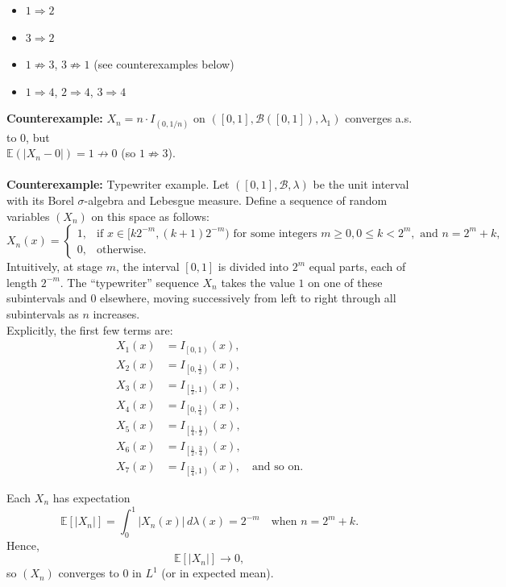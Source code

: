 \documentclass[11pt,a4paper]{article}
\theoremstyle{definition}
\begin{document}
\begin{itemize}
  \item $1 \Rightarrow 2$
  \item $3 \Rightarrow 2$
  \item $1 \not\Rightarrow 3$, $3 \not\Rightarrow 1$ (see counterexamples below)
  \item $1 \Rightarrow 4$, $2 \Rightarrow 4$, $3 \Rightarrow 4$
\end{itemize}
\noindent
\textbf{Counterexample:} $X_n = n \cdot I_{(0,1/n)}$ on $([0,1], \mathcal{B}([0,1]), \lambda_1)$ converges a.s. to $0$, but \\ $\mathbb{E}(|X_n - 0|) = 1 \not\to 0$ (so $1 \not\Rightarrow 3$).~\\~\\
\noindent
\textbf{Counterexample:} Typewriter example. Let $( [0,1], \mathcal{B}, \lambda )$ be the unit interval with its Borel $\sigma$-algebra and Lebesgue measure.  
Define a sequence of random variables $(X_n)$ on this space as follows:
\[
X_n(x) = 
\begin{cases}
1, & \text{if } x \in [k 2^{-m}, (k+1)2^{-m}) \text{ for some integers } m \ge 0, 0 \le k < 2^m, \text{ and } n = 2^m + k, \\[6pt]
0, & \text{otherwise.}
\end{cases}
\]
\noindent
Intuitively, at stage $m$, the interval $[0,1]$ is divided into $2^m$ equal parts, each of length $2^{-m}$.  
The ``typewriter'' sequence $X_n$ takes the value $1$ on one of these subintervals and $0$ elsewhere, moving successively from left to right through all subintervals as $n$ increases.~\\
\noindent
Explicitly, the first few terms are:
\[
\begin{aligned}
X_1(x) &= I_{\left [0,1\right )}(x), \\
X_2(x) &= I_{\left [0,\tfrac{1}{2}\right )}(x), \\
X_3(x) &= I_{\left [\tfrac{1}{2},1\right )}(x), \\
X_4(x) &= I_{\left [0,\tfrac{1}{4}\right )}(x), \\
X_5(x) &= I_{\left [\tfrac{1}{4},\tfrac{1}{2}\right )}(x), \\
X_6(x) &= I_{\left [\tfrac{1}{2},\tfrac{3}{4}\right )}(x), \\
X_7(x) &= I_{\left [\tfrac{3}{4},1\right )}(x), \quad \text{and so on.}
\end{aligned}
\]

\medskip

\noindent
Each $X_n$ has expectation
\[
\mathbb{E}[|X_n|] = \int_0^1 |X_n(x)| \, d\lambda(x) = 2^{-m}
\quad \text{when } n = 2^m + k.
\]
Hence,
\[
\mathbb{E}[|X_n|] \longrightarrow 0,
\]
so $(X_n)$ converges to $0$ in $L^1$ (or in expected mean).
\end{document}
